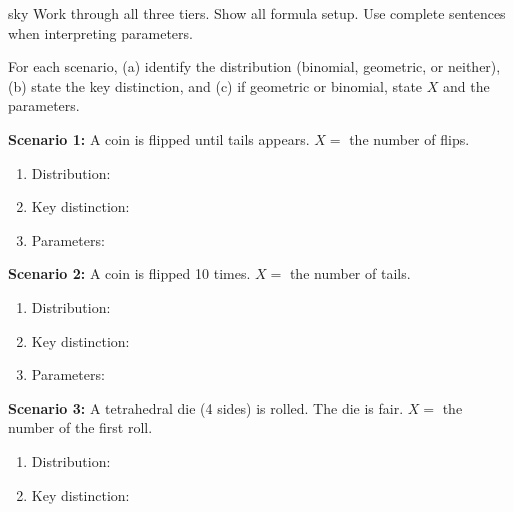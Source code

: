 \documentclass[10pt]{article}
\begin{document}
\namepartnerperiod

\vspace{0.1in}

\begin{scenariobox}[Directions]{sky}
\small
Work through all three tiers. Show all formula setup. Use complete sentences
when interpreting parameters.
\end{scenariobox}

\vspace{0.1in}

\begin{tcolorbox}[colback=goldbg, colframe=goldacc, boxrule=1pt, arc=2mm,
    title={\bfseries Tier R \quad Remediate: Identifying the Distribution},
    fonttitle=\small]
\small

For each scenario, (a) identify the distribution (binomial, geometric, or neither),
(b) state the key distinction, and (c) if geometric or binomial, state $X$ and the
parameters.

\vspace{10pt}
\textbf{Scenario 1:} A coin is flipped until tails appears.
$X =$ the number of flips.
\begin{enumerate}[label=(\alph*), leftmargin=2em, itemsep=6pt]
  \item Distribution: \blank{4cm}
  \item Key distinction: \writeline
  \item Parameters: \blank{6cm}
\end{enumerate}

\vspace{10pt}
\textbf{Scenario 2:} A coin is flipped 10 times.
$X =$ the number of tails.
\begin{enumerate}[label=(\alph*), leftmargin=2em, itemsep=6pt]
  \item Distribution: \blank{4cm}
  \item Key distinction: \writeline
  \item Parameters: \blank{6cm}
\end{enumerate}

\vspace{10pt}
\textbf{Scenario 3:} A tetrahedral die (4 sides) is rolled. The die is fair.
$X =$ the number of the first roll.
\begin{enumerate}[label=(\alph*), leftmargin=2em, itemsep=6pt]
  \item Distribution: \blank{4cm}
  \item Key distinction: \writeline
\end{enumerate}
\vspace{4pt}
\end{tcolorbox}
\end{document}
